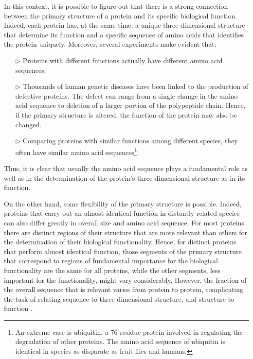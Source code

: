 In this context, it is possible to figure out that there is a strong connection between the primary structure of a protein and its specific biological function. Indeed, each protein has, at the same time, a unique three-dimensional structure that determine its function and a specific sequence of amino acids that identifies the protein uniquely.
Moreover, several experiments make evident that:
\begin{itemize}
\item[$\triangleright$] Proteins with different functions actually have different amino acid sequences. 
\item[$\triangleright$] Thousands of human genetic diseases have been linked to the production of defective proteins. The defect can range from a single change in the amino acid sequence to deletion of a larger portion of the polypeptide chain. Hence, if the primary structure is altered, the function of the protein may also be changed. 
\item[$\triangleright$] Comparing proteins with similar functions among different species, they often have similar amino acid sequences\footnote{An extreme case is ubiquitin, a 76-residue protein involved in regulating the degradation of other proteins. The amino acid sequence of ubiquitin is identical in species as disparate as fruit flies and humans.}.
\end{itemize}
Thus, it is clear that usually the amino acid sequence plays a fundamental role as well as in the determination of the protein's three-dimensional structure as in its function.


On the other hand, some flexibility of the primary structure is possible. Indeed, proteins that carry out an almost identical function in distantly related species can also differ greatly in overall size and amino acid sequence. For most proteins 
there are distinct regions of their structure that are more relevant than others for the determination of their biological functionality. Hence, for distinct proteins that perform almost identical function, those segments of the primary structure that correspond to regions of fundamental importance for the biological functionality are the same for all proteins, while the other segments, less important for the functionality, might vary considerably. However, the fraction of the overall sequence that is relevant varies from protein to protein, complicating the task of relating sequence to three-dimensional structure, and structure to function
\cite{nelson2008lehninger}.

